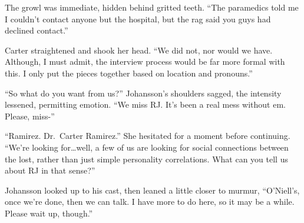 The growl was immediate, hidden behind gritted teeth. ``The paramedics told me I couldn't contact anyone but the hospital, but the rag said you guys had declined contact.''

Carter straightened and shook her head. ``We did not, nor would we have. Although, I must admit, the interview process would be far more formal with this. I only put the pieces together based on location and pronouns.''

``So what do you want from us?'' Johansson's shoulders sagged, the intensity lessened, permitting emotion. ``We miss RJ. It's been a real mess without em. Please, miss-''

``Ramirez. Dr.~Carter Ramirez.'' She hesitated for a moment before continuing. ``We're looking for\ldots{}well, a few of us are looking for social connections between the lost, rather than just simple personality correlations. What can you tell us about RJ in that sense?''

Johansson looked up to his cast, then leaned a little closer to murmur, ``O'Niell's, once we're done, then we can talk. I have more to do here, so it may be a while. Please wait up, though.''
